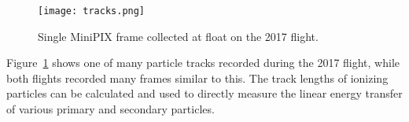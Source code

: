 \begin{figure}[H]
\centering
\texttt{[image: tracks.png]} %
\caption{Single MiniPIX frame collected at float on the 2017 flight.}
\label{fig:frame1}
\end{figure}
Figure~\ref{fig:frame1} shows one of many particle tracks recorded during the 2017 flight, while both flights recorded many frames similar to this.  The track lengths of ionizing particles can be calculated and used to directly measure the linear energy transfer of various primary and secondary particles.


